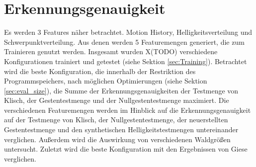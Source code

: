 \section{Erkennungsgenauigkeit}
Es werden 3 Features näher betrachtet. Motion History, Helligkeitsverteilung und Schwerpunktverteilung. Aus denen werden 5 Featuremengen generiert, die zum Trainieren genutzt werden. Insgesamt wurden X(TODO)
verschiedene Konfigurationen trainiert und getestet (siehe Sektion \ref{sec:Training}).
\newline
\newline
Betrachtet wird die beste Konfiguration, die innerhalb der Restriktion des Programmspeichers, nach möglichen Optimierungen (siehe Sektion \ref{sec:eval_size}), die Summe der Erkennungsgenauigkeiten
der Testmenge von Klisch, der Gestentestmenge und der Nullgestentestmenge maximiert.
\newline
\newline
Die verschiedenen Featuremengen werden im Hinblick auf die Erkennungsgenauigkeit auf der Testmenge von Klisch, der Nullgestentestmenge, der neuerstellten Gestentestmenge und den synthetischen
Helligkeitstestmengen untereinander verglichen. Außerdem wird die Auswirkung von verschiedenen Waldgrößen untersucht. Zuletzt wird die beste Konfiguration mit den Ergebnissen von Giese verglichen.







